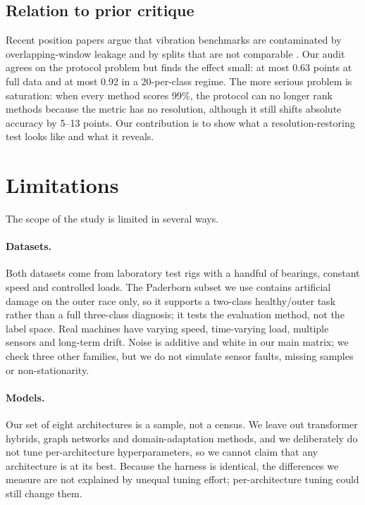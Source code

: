 \subsection{Relation to prior critique}
Recent position papers argue that vibration benchmarks are contaminated by overlapping-window leakage and by splits that are not comparable \citep{phme2026,ssrn2024}. Our audit agrees on the protocol problem but finds the effect small: at most 0.63 points at full data and at most 0.92 in a 20-per-class regime. The more serious problem is saturation: when every method scores 99\%, the protocol can no longer rank methods because the metric has no resolution, although it still shifts absolute accuracy by 5--13 points. Our contribution is to show what a resolution-restoring test looks like and what it reveals.

\section{Limitations}

The scope of the study is limited in several ways.

\paragraph{Datasets.} Both datasets come from laboratory test rigs with a handful of bearings, constant speed and controlled loads. The Paderborn subset we use contains artificial damage on the outer race only, so it supports a two-class healthy/outer task rather than a full three-class diagnosis; it tests the evaluation method, not the label space. Real machines have varying speed, time-varying load, multiple sensors and long-term drift. Noise is additive and white in our main matrix; we check three other families, but we do not simulate sensor faults, missing samples or non-stationarity.

\paragraph{Models.} Our set of eight architectures is a sample, not a census. We leave out transformer hybrids, graph networks and domain-adaptation methods, and we deliberately do not tune per-architecture hyperparameters, so we cannot claim that any architecture is at its best. Because the harness is identical, the differences we measure are not explained by unequal tuning effort; per-architecture tuning could still change them.

